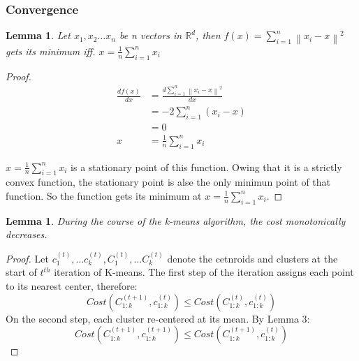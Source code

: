 \documentclass[11pt]{article}
\newtheorem{lemma}[theorem]{Lemma}
\begin{document}
\subsubsection{Convergence}
\begin{lemma}
  Let $x_1, x_2 \dots x_n$ be n vectors in $\mathbb{R}^{d}$, then $f(x) = \sum_{i=1}^{n} {\left\lVert x_i - x\right\rVert}^2 $ gets its minimum iff. $x = \frac{1}{n} \sum_{i=1}^{n}x_i$
\end{lemma}
\begin{proof}
  \begin{equation*}
    \begin{split}
      \frac{d f(x)}{d x} &=  \frac{d \sum_{i=1}^{n} {\left\lVert x_i - x\right\rVert}^2}{d x} \\
      & = -2\sum_{i=1}^{n} (x_i - x) \\
      & = 0 \\
      x & = \frac{1}{n} \sum_{i=1}^{n}x_i
    \end{split}
  \end{equation*}
  
  \par $x = \frac{1}{n} \sum_{i=1}^{n}x_i$ is a stationary point of this function. Owing that it is a strictly convex function, the stationary point is alse the only minimun point of that function. 
  So the function gets its minimum at $x = \frac{1}{n} \sum_{i=1}^{n}x_i$.
  \end{proof}
  \begin{lemma}
    During the course of the k-means algorithm, the cost monotonically decreases.
  \par 
  \end{lemma}
  \begin{proof}
    Let $c_1^{(t)}, \dots c_k^{(t)}, C_1^{(t)}, \dots C_k^{(t)}$ denote the cetnroids and clusters at the start of $t^{th}$ iteration of K-means.
    The first step of the iteration assigns each point to its nearest center, therefore:
    $$Cost(C_{1:k}^{(t+1)}, c_{1:k}^{(t)}) \leq Cost(C_{1:k}^{(t)}, c_{1:k}^{(t)})$$
    On the second step, each cluster re-centered at its mean. By Lemma 3:
    $$Cost(C_{1:k}^{(t+1)}, c_{1:k}^{(t+1)}) \leq Cost(C_{1:k}^{(t+1)}, c_{1:k}^{(t)})$$
  \end{proof}
\end{document}
